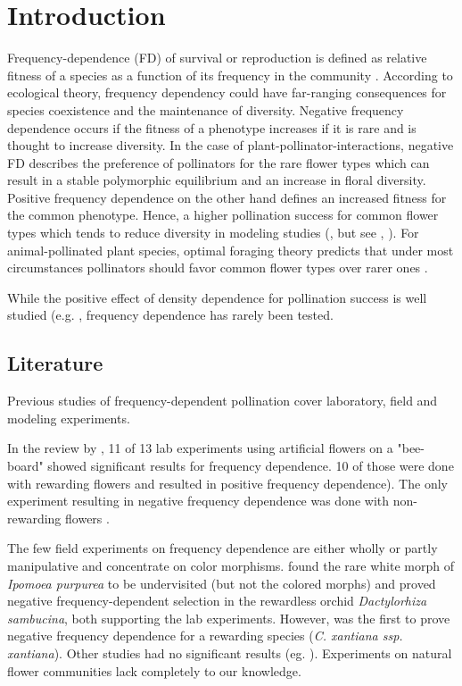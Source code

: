 \section{Introduction}

Frequency-dependence (FD) of survival or reproduction is defined as relative fitness of a species as a function of its frequency in the community \citep{ayala1974frequency,wright1946genetics}.
According to ecological theory, frequency dependency could have far-ranging consequences for species coexistence and the maintenance of diversity. 
Negative frequency dependence occurs if the fitness of a phenotype increases if it is rare and is thought to increase diversity. In the case of plant-pollinator-interactions, negative FD describes the preference of pollinators for the rare flower types which can result in a stable polymorphic equilibrium and an increase in floral diversity. Positive frequency dependence on the other hand defines an increased fitness for the common phenotype. Hence, a higher pollination success for common flower types which tends to reduce diversity in modeling studies (\citealt{may1974stability}, but see \citealt{bever1999dynamics}, \citealt{molofsky2002novel}).
For animal-pollinated plant species, optimal foraging theory predicts that under most circumstances pollinators should favor common flower types over rarer ones \citep{kunin1996pollinator}. 
 
 While the positive effect of density dependence for pollination success is well studied (e.g. \citealt{essenberg2012explaining,bernhardt2008effects,kunin1993sex,morris2010benefit}, frequency dependence has rarely been tested.

\subsection*{Literature}

Previous studies of frequency-dependent pollination cover laboratory, field and modeling experiments.

In the review by \cite{smithson2001pollinator}, 11 of 13 lab experiments using artificial flowers on a "bee-board" showed significant results for frequency dependence. 10 of those were done with rewarding flowers and resulted in positive frequency dependence\citep{smithson1996frequency,smithson1997density}). The only experiment resulting in negative frequency dependence was done with non-rewarding flowers \citep{smithson1997negative}. 

The few field experiments on frequency dependence are either wholly or partly manipulative and concentrate on color morphisms. \cite{epperson1987frequency} found the rare white morph of \textit{Ipomoea purpurea} to be undervisited (but not the colored morphs) and \cite{gigord2001negative} proved negative frequency-dependent selection in the rewardless orchid \textit{Dactylorhiza sambucina}, both supporting the lab experiments. However, \cite{Eckhart2006frequency} was the first to prove negative frequency dependence for a rewarding species (\textit{C. xantiana ssp. xantiana}). Other studies had no significant results (eg. \citealt{jones1996pollinator, mogford1978pollination}). Experiments on natural flower communities lack completely to our knowledge. 

